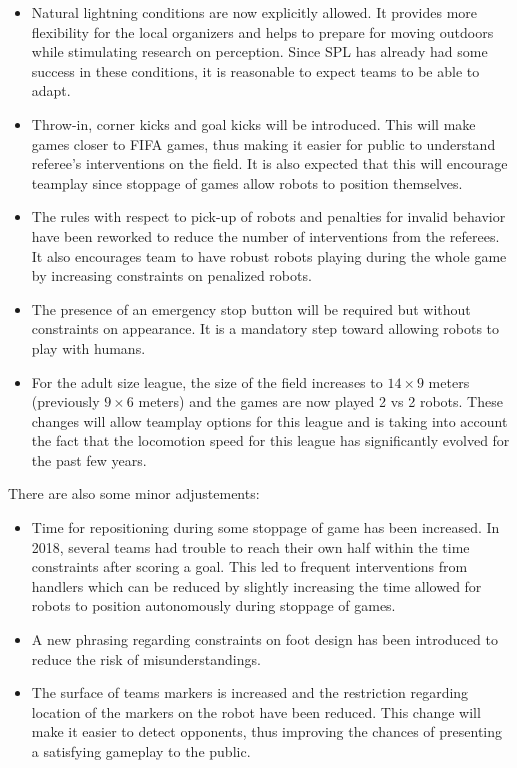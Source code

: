 \documentclass{article}
\begin{document}
\begin{itemize}
\item Natural lightning conditions are now explicitly allowed.
  It provides more flexibility for the local organizers and
  helps to prepare for moving outdoors while stimulating research on perception.
  Since SPL has already had some success in these conditions,
  it is reasonable to expect teams to be able to adapt.
\item Throw-in, corner kicks and goal kicks will be introduced.
  This will make games closer to FIFA games,
  thus making it easier for public to understand referee's interventions on the field.
  It is also expected that this will encourage teamplay since stoppage of games
  allow robots to position themselves.
\item The rules with respect to pick-up of robots and penalties for invalid
  behavior have been reworked to reduce the number of interventions from the referees.
  It also encourages team to have robust robots playing during the whole game by
  increasing constraints on penalized robots.
\item The presence of an emergency stop button will be required but without
  constraints on appearance.
  It is a mandatory step toward allowing robots to play with humans.
\item For the adult size league, the size of the field increases to
  $14 \times 9$ meters (previously $9 \times 6$ meters)
  and the games are now played 2 vs 2 robots.
  These changes will allow teamplay options for this league and is taking into
  account the fact that the locomotion speed for this league has significantly
  evolved for the past few years.
\end{itemize}

There are also some minor adjustements:

\begin{itemize}
\item Time for repositioning during some stoppage of game has been increased.
  In 2018, several teams had trouble to reach their own half within the time
  constraints after scoring a goal.
  This led to frequent interventions from handlers which can be reduced by
  slightly increasing the time allowed for robots to position autonomously
  during stoppage of games.
\item A new phrasing regarding constraints on foot design has been introduced to
  reduce the risk of misunderstandings.
\item The surface of teams markers is increased and the restriction regarding
  location of the markers on the robot have been reduced.
  This change will make it easier to detect opponents,
  thus improving the chances of presenting a satisfying gameplay to the public.
\end{itemize}
\end{document}
